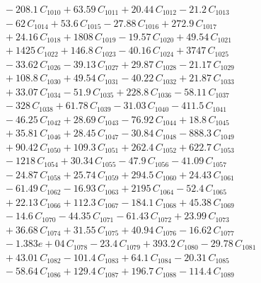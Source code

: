 \documentclass[a4paper,11pt]{article}
\begin{document}
\begin{align}
&\quad - 208.1\,C_{1010} + 63.59\,C_{1011} + 20.44\,C_{1012} - 21.2\,C_{1013} \nonumber\\
&\quad - 62\,C_{1014} + 53.6\,C_{1015} - 27.88\,C_{1016} + 272.9\,C_{1017} \nonumber\\
&\quad + 24.16\,C_{1018} + 1808\,C_{1019} - 19.57\,C_{1020} + 49.54\,C_{1021} \nonumber\\
&\quad + 1425\,C_{1022} + 146.8\,C_{1023} - 40.16\,C_{1024} + 3747\,C_{1025} \nonumber\\
&\quad - 33.62\,C_{1026} - 39.13\,C_{1027} + 29.87\,C_{1028} - 21.17\,C_{1029} \nonumber\\
&\quad + 108.8\,C_{1030} + 49.54\,C_{1031} - 40.22\,C_{1032} + 21.87\,C_{1033} \nonumber\\
&\quad + 33.07\,C_{1034} - 51.9\,C_{1035} + 228.8\,C_{1036} - 58.11\,C_{1037} \nonumber\\
&\quad - 328\,C_{1038} + 61.78\,C_{1039} - 31.03\,C_{1040} - 411.5\,C_{1041} \nonumber\\
&\quad - 46.25\,C_{1042} + 28.69\,C_{1043} - 76.92\,C_{1044} + 18.8\,C_{1045} \nonumber\\
&\quad + 35.81\,C_{1046} + 28.45\,C_{1047} - 30.84\,C_{1048} - 888.3\,C_{1049} \nonumber\\
&\quad + 90.42\,C_{1050} + 109.3\,C_{1051} + 262.4\,C_{1052} + 622.7\,C_{1053} \nonumber\\
&\quad - 1218\,C_{1054} + 30.34\,C_{1055} - 47.9\,C_{1056} - 41.09\,C_{1057} \nonumber\\
&\quad - 24.87\,C_{1058} + 25.74\,C_{1059} + 294.5\,C_{1060} + 24.43\,C_{1061} \nonumber\\
&\quad - 61.49\,C_{1062} - 16.93\,C_{1063} + 2195\,C_{1064} - 52.4\,C_{1065} \nonumber\\
&\quad + 22.13\,C_{1066} + 112.3\,C_{1067} - 184.1\,C_{1068} + 45.38\,C_{1069} \nonumber\\
&\quad - 14.6\,C_{1070} - 44.35\,C_{1071} - 61.43\,C_{1072} + 23.99\,C_{1073} \nonumber\\
&\quad + 36.68\,C_{1074} + 31.55\,C_{1075} + 40.94\,C_{1076} - 16.62\,C_{1077} \nonumber\\
&\quad - 1.383e+04\,C_{1078} - 23.4\,C_{1079} + 393.2\,C_{1080} - 29.78\,C_{1081} \nonumber\\
&\quad + 43.01\,C_{1082} - 101.4\,C_{1083} + 64.1\,C_{1084} - 20.31\,C_{1085} \nonumber\\
&\quad - 58.64\,C_{1086} + 129.4\,C_{1087} + 196.7\,C_{1088} - 114.4\,C_{1089} \nonumber\\

\end{align}
\end{document}
